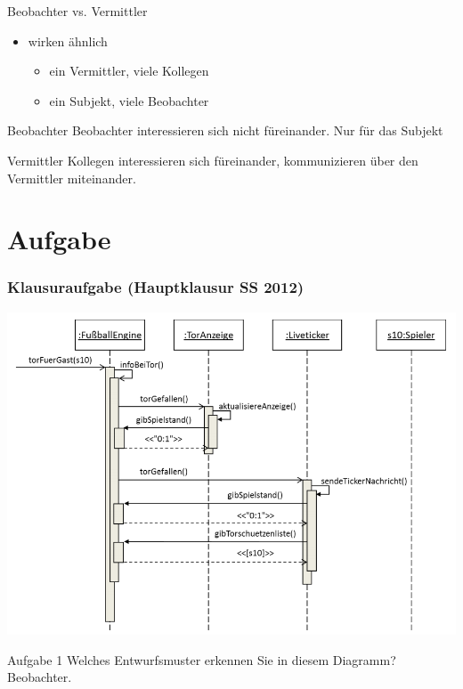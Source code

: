 \documentclass[18pt]{beamer}
\begin{document}
\begin{frame}{Beobachter vs. Vermittler}
	\begin{itemize}
	\item wirken ähnlich
	\begin{itemize}
	\item ein Vermittler, viele Kollegen
	\item ein Subjekt, viele Beobachter
	\end{itemize}
	\end{itemize}
	\pause
	\begin{block}{Beobachter}
	Beobachter interessieren sich nicht füreinander. Nur für das Subjekt
	\end{block}
	\begin{block}{Vermittler}
	Kollegen interessieren sich füreinander, kommunizieren über den Vermittler miteinander.
	\end{block}
\end{frame}

\section{Aufgabe}
	\begin{frame}
	\frametitle{Klausuraufgabe (Hauptklausur SS 2012)}
	\includegraphics[scale=0.35]{./pics/tut3/obs-task.png}	
	\begin{block}{Aufgabe 1}
	Welches Entwurfsmuster erkennen Sie in diesem Diagramm? \pause
	Beobachter.
	\end{block}
\end{frame}
\end{document}
